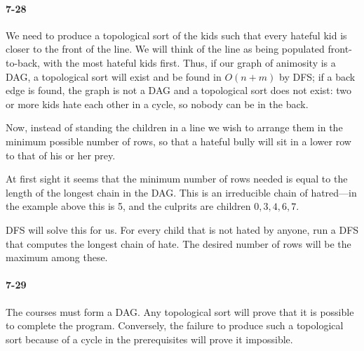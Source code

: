 \documentclass{report}
\begin{document}
\paragraph{7-28} We need to produce a topological sort of the kids such that every hateful kid is closer to the front of the line. We will think of the line as being populated front-to-back, with the most hateful kids first. Thus, if our graph of animosity is a DAG, a topological sort will exist and be found in $O(n+m)$ by DFS; if a back edge is found, the graph is not a DAG and a topological sort does not exist: two or more kids hate each other in a cycle, so nobody can be in the back.

\smallskip

Now, instead of standing the children in a line we wish to arrange them in the minimum possible number of rows, so that a hateful bully will sit in a lower row to that of his or her prey.

\begin{center}
\end{center}

At first sight it seems that the minimum number of rows needed is equal to the length of the longest chain in the DAG. This is an irreducible chain of hatred---in the example above this is 5, and the culprits are children $0,3,4,6,7$.

DFS will solve this for us. For every child that is not hated by anyone, run a DFS that computes the longest chain of hate. The desired number of rows will be the maximum among these.

\paragraph{7-29} The courses must form a DAG. Any topological sort will prove that it is possible to complete the program. Conversely, the failure to produce such a topological sort because of a cycle in the prerequisites will prove it impossible.
\end{document}
